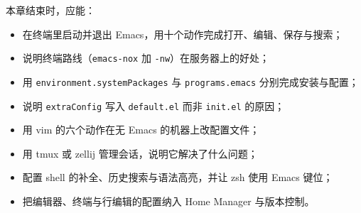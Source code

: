 \begin{checkpoint}
本章结束时，应能：
\begin{itemize}
  \item 在终端里启动并退出 Emacs，用十个动作完成打开、编辑、保存与搜索；
  \item 说明终端路线（\texttt{emacs-nox} 加 \texttt{-nw}）在服务器上的好处；
  \item 用 \texttt{environment.\allowbreak{}systemPackages} 与 \texttt{programs.emacs} 分别完成安装与配置；
  \item 说明 \texttt{extraConfig} 写入 \texttt{default.el} 而非 \texttt{init.el} 的原因；
  \item 用 vim 的六个动作在无 Emacs 的机器上改配置文件；
  \item 用 tmux 或 zellij 管理会话，说明它解决了什么问题；
  \item 配置 shell 的补全、历史搜索与语法高亮，并让 zsh 使用 Emacs 键位；
  \item 把编辑器、终端与行编辑的配置纳入 Home Manager 与版本控制。
\end{itemize}
\end{checkpoint}
